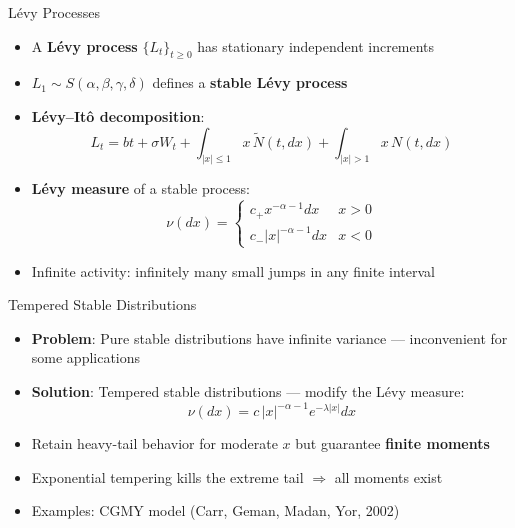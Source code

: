 \documentclass[9pt, aspectratio=169, t]{beamer}
\theoremstyle{definition}
\begin{document}
\begin{frame}{L\'{e}vy Processes}
\begin{itemize}
\item A \textbf{L\'{e}vy process} $\{L_t\}_{t\geq 0}$ has stationary independent increments
\item $L_1 \sim S(\alpha, \beta, \gamma, \delta)$ defines a \textbf{stable L\'{e}vy process}
\item \textbf{L\'{e}vy--It\^{o} decomposition}:
\[
L_t = bt + \sigma W_t + \int_{|x|\leq 1} x\,\tilde{N}(t,dx) + \int_{|x|>1} x\,N(t,dx)
\]
\item \textbf{L\'{e}vy measure} of a stable process:
\[
\nu(dx) = \begin{cases} c_+ x^{-\alpha-1}dx & x > 0 \\ c_- |x|^{-\alpha-1}dx & x < 0 \end{cases}
\]
\item Infinite activity: infinitely many small jumps in any finite interval
\end{itemize}
\end{frame}

\begin{frame}{Tempered Stable Distributions}
\begin{itemize}
\item \textbf{Problem}: Pure stable distributions have infinite variance --- inconvenient for some applications
\item \textbf{Solution}: Tempered stable distributions --- modify the L\'{e}vy measure:
\[
\nu(dx) = c\,|x|^{-\alpha-1}e^{-\lambda|x|}dx
\]
\item Retain heavy-tail behavior for moderate $x$ but guarantee \textbf{finite moments}
\item Exponential tempering kills the extreme tail $\Rightarrow$ all moments exist
\item Examples: CGMY model (Carr, Geman, Madan, Yor, 2002)
\end{itemize}
\end{frame}
\end{document}
